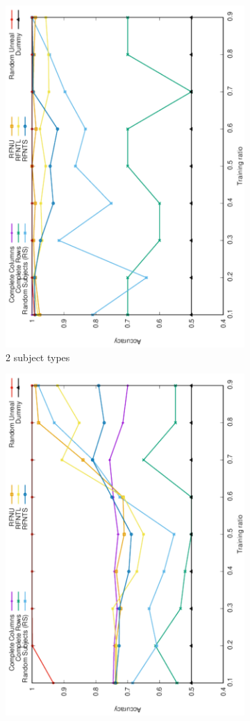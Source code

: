 \documentclass[10pt, conference, compsocconf]{IEEEtran}
\begin{document}
\begin{figure}
\begin{subfigure}[b]{0.4\linewidth}
        \includegraphics[width=0.8\columnwidth, angle=-90]{data/results/means_of_results/ALS/Synthetic/synthetic_subject_types/ALS-2-types.pdf}
        \caption{2 subject types}
\end{subfigure}
\begin{subfigure}[b]{0.4\linewidth}
        \includegraphics[width=0.8\columnwidth, angle=-90]{data/results/means_of_results/ALS/Synthetic/synthetic_subject_types/ALS-4-types.pdf}

\end{subfigure}
\end{figure}
\end{document}
